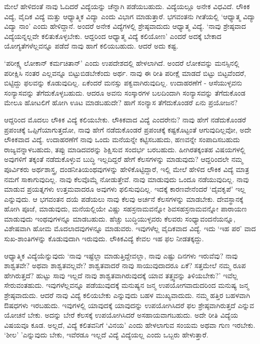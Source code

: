 ಮೇಲೆ ಹೇಳಿದಂತೆ ನಾವು ಓದಿದರೆ ವಿದ್ಯೆಯನ್ನು ಚೆನ್ನಾಗಿ ಪಡೆಯಬಹುದು. ವಿದ್ಯೆಯಲ್ಲೂ ಅನೇಕ ವಿಧವಿದೆ. ಲೌಕಿಕ ವಿದ್ಯೆ, ವೈದಿಕ ವಿದ್ಯೆ ಮತ್ತು 
ಆಧ್ಯಾತ್ಮಿಕ ವಿದ್ಯಾ  ಎಂದು ವಿಭಾಗ ಮಾಡುತ್ತಾರೆ. ಭಗವಂತನು ಗೀತೆಯಲ್ಲಿ `ಆಧ್ಯಾತ್ಮ ವಿದ್ಯಾ ವಿದ್ಯಾ ನಾಂ' ಎಂದು ಹೇಳಿದ್ದಾನೆ. ಅಂದರೆ ಅನೇಕ 
ವಿದ್ಯೆಗಳಲ್ಲಿ ಶ್ರೇಷ್ಠವಾದುದು ಆಧ್ಯಾತ್ಮ ವಿದ್ಯೆ. `ನಾವು ಶ್ರೇಷ್ಠವಾದ ವಿದ್ಯೆಯನ್ನಲ್ಲವೇ ಕಲಿತುಕೊಳ್ಳಬೇಕು. ಆದ್ದರಿಂದ ಆಧ್ಯಾತ್ಮ ವಿದ್ಯೆ ಕಲಿಯೋಣ' 
ಎಂದರೆ ಅದಕ್ಕೆ ಬೇಕಾದ ಯೋಗ್ಯತೆಗಳೆಲ್ಲವನ್ನೂ ಪಡೆದೆ ನಾವು ಹಾಗೆ ಕಲಿಯಬಹುದು. ಆದರೆ ಅದು ಕಷ್ಟ.

`ಪರೀಕ್ಷ್ಯ ಲೋಕಾನ್ ಕರ್ಮಚಿತಾನ್' ಎಂದು ಉಪದೇಶದಲ್ಲಿ ಹೇಳಲಾಗಿದೆ. ಅಂದರೆ ಲೋಕವನ್ನು ಮನಸ್ಸಿನಲ್ಲಿ ಪರೀಕ್ಷಿಸಿ ನಂತರ ಎಲ್ಲವನ್ನೂ ಬಿಟ್ಟುಬಿಡಬೇಕೆಂದು ಅರ್ಥ. 
ನಾವು ಈ ರೀತಿ ಪರೀಕ್ಷೆ ಮಾಡದೆ ಬಿಟ್ಟು ಬಿಟ್ಟವೆಂದರೆ, ಬಿಟ್ಟಿದ್ದು ಫಲವನ್ನು ಕೊಡುವುದಿಲ್ಲ. ಏಕೆಂದರೆ ಮನಸ್ಸು ಪಕ್ವವಾಗಿರುವುದಿಲ್ಲ. ಉದಾಹರಣೆಗೆ - ಆಸೆಯುಳ್ಳವನು 
ಸಂನ್ಯಾಸವನ್ನು ತೆಗೆದುಕೊಳ್ಳಬಹುದು. ಆದರೂ ಅವನು ಸಂಸ್ಕಾರಗಳ ಬಲದಿಂದಾಗಿ ಸಂನ್ಯಾಸವನ್ನು ತೆಗೆದುಕೊಂಡ 
ಮೇಲೂ ಹೋಟಲಿಗೆ ಹೋಗಿ ಊಟ ಮಾಡಬಹುದೇ? ಹಾಗೆ ಸಂನ್ಯಾಸ ತೆಗೆದುಕೊಂಡರೆ ಏನು ಪ್ರಯೋಜನ?

ಆದ್ದರಿಂದ ಮೊದಲು ಲೌಕಿಕ ವಿದ್ಯೆ ಕಲಿಯಬೇಕು. ಲೌಕಿಕವಾದ ವಿದ್ಯೆ ಎಂದರೇನು? ನಾವು ಹೇಗೆ ನಡೆದುಕೊಂಡರೆ ಪ್ರಪಂಚಕ್ಕೆ ಒಪ್ಪಿಗೆಯಾಗುತ್ತದೋ, ನಾವು 
ಹೇಗೆ ನಡೆದುಕೊಂಡರೆ ಪ್ರಪಂಚಕ್ಕೆ ಕಷ್ಟಕೊಟ್ಟಂತೆ ಆಗುವುದಿಲ್ಲವೋ, ಅದೇ ಲೌಕಿಕವಾದ ವಿದ್ಯೆ. ಉದಾಹರಣೆಗೆ ನಾವು ಒಂದು ಮನೆಯನ್ನೇ ಕಟ್ಟಿಸಬಹುದು, 
ಹಣವನ್ನೇ ಸಂಪಾದಿಸಬಹುದು ರಾಜ್ಯವನ್ನಾಳಬಹುದು, ತಪ್ಪು ಮಾಡಿದವರನ್ನು ಶಿಕ್ಷಿಸುವ ಸಂದರ್ಭ ಬರಬಹುದು. ಹೀಗಿರತಕ್ಕಂತಹ ವಿಷಯಗಳಲ್ಲಿ 
ಅವುಗಳಿಗೆ ತಕ್ಕಂತೆ ನಡೆದುಕೊಳ್ಳುವ ಬುದ್ಧಿ ಇಲ್ಲದಿದ್ದರೆ ಹೇಗೆ ಕೆಲಸಗಳನ್ನು ಮಾಡುವುದು? ಆದ್ದರಿಂದಲೇ ನಮ್ಮ ಪೂರ್ವಿಕರು ಅರ್ಥಶಾಸ್ತ್ರ, 
ದಂಡನೀತಿಯಂಥವುಗಳನ್ನು ಹೇಳಿಕೊಟ್ಟಿದ್ದಾರೆ, ಇಲ್ಲಿ ಮೇಲೆ ಹೇಳಿದ ಲೌಕಿಕ ವಿದ್ಯೆ ಮಾತ್ರ ನಮಗೆ ಸಾಕಾಗುವುದಿಲ್ಲ. ನಾವು ಕೆಲವೊಮ್ಮೆ 
ನೋಡುತ್ತೇವೆ. ನಾವು ಮಾಡುವುದು ಒಂದೂ ನಡೆಯುವುದಿಲ್ಲ. ನಾವು ಮಾಡುವ ಪ್ರಯತ್ನಗಳು ಉತ್ತಮವಾದರೂ ಅವುಗಳು ಫಲಿಸುವುದಿಲ್ಲ. ಇದಕ್ಕೆ 
ಕಾರಣವೇನೆಂದರೆ `ದೈವಕೃಪೆ' ಇಲ್ಲ ಎನ್ನುವುದು. ಆ ಭಗವಂತನ ದಯೆ ಪಡೆಯಲು ನಾವು ಕೆಲವು ಅರ್ಚನೆ ಕೆಲಸಗಳನ್ನು ಮಾಡಬೇಕು. ದೇವಸ್ಥಾನಕ್ಕೆ 
ಹೋಗಿ ಪೂಜೆ, ಮಾಡುವುದು, ಮನೆಯಲ್ಲಿಯೇ ವಿಷ್ಣು ಸಹಸ್ರನಾಮವನ್ನೋ ಶಿವಸಹಸ್ರನಾಮವನ್ನೋ ಪಾರಾಯಣ ಮಾಡುವುದು ಇಂಥವುಗಳನ್ನೂ 
ಮಾಡಬಹುದು. ಹೆಚ್ಚು ಬುದ್ಧಿಯುಳ್ಳವರು ಕೆಲವರು ಸಂಧ್ಯಾವಂದನೆಯನ್ನೂ, ವಿಶೇಷವಾಗಿ ಹೋಮ ಮೊದಲಾದವುಗಳನ್ನೂ ಮಾಡುವರು. 
ಇವುಗಳೆಲ್ಲ ವೈದಿಕವಾದ ವಿದ್ಯೆ. ಇದು `ಇಹ ಪರ' ವಾದ ಸುಖ-ಶಾಂತಿಗಳನ್ನು ಕೊಡುವುದಾಗಿ ಇರುವುದು. ಲೌಕಿಕವಿದ್ಯೆ ಕೇವಲ ಇಹ ಫಲ ನೀಡತಕ್ಕದ್ದು.

ಆಧ್ಯಾತ್ಮಿಕ ವಿದ್ಯೆಯೆನ್ನುವುದು `ನಾವು ಇಷ್ಟೆಲ್ಲಾ ಮಾಡುತ್ತಿದ್ದೇವಲ್ಲಾ, ನಾವು ಎಷ್ಟು ದಿನಗಳು ಇರುವೆವು? ನಾವು ಶಾಶ್ವತವೇ? ಅಥವಾ ಶಾಶ್ವತವಲ್ಲವೇ? ಶಾಶ್ವತವಾದರೆ 
ನಾವು ಸಾಯುವುದಾದರೂ ಏಕೆ? ಸತ್ತಮೇಲೆ ನಮ್ಮ ರೂಪ ಹೇಗಿರುತ್ತದೆ? ಹುಟ್ಟು ಸಾವು ಇಲ್ಲದೆ ನಾವು ಶಾಶ್ವತವಾಗಿರುವುದಕ್ಕೆ ಯಾವ 
ತತ್ತ್ವವನ್ನು ತಿಳಿಯಬೇಕು?' ಇವೆಲ್ಲ ಸೇರುವಂತಹುದು. ಇವುಗಳೆಲ್ಲವನ್ನೂ ಪಡೆಯುವುದಕ್ಕೆ ಮನುಷ್ಯನ ಜನ್ಮ ಉಪಯೋಗವಾದುದರಿಂದ ಮನುಷ್ಯ 
ಜನ್ಮ ಶ್ರೇಷ್ಠವಾದುದು. ಆದರೆ ನಾವು ವಿದ್ಯೆ ಕಲಿಯಬೇಕು ಎನ್ನುವುದು ಬಹಳ ಮುಖ್ಯವಾದುದು. ನಮ್ಮ ಹತ್ತಿರ ಬಹಳವಾಗಿ ಔಷಧಗಳು ಇರಬಹುದು. 
ಇವುಗಳಲ್ಲಿ ಯಾವುದಕ್ಕೆ ಯಾವುದನ್ನು ಉಪಯೋಗಿಸಿದರೆ ಫಲ ಶ್ರೇಷ್ಠವಾಗಿರುತ್ತದೆ ಎನ್ನುವ ಯೋಚನೆ ಬೇಕು. ಅದನ್ನು ಬೇರೆ ಕೆಲಸಕ್ಕೆ ಉಪಯೋಗಿಸಿದರೆ 
ಅಸಹಾಯವಾಗಬಹುದು. ಅದೇ ರೀತಿ ವಿದ್ಯೆಯ ವಿಷಯವೂ ಕೂಡ. ಅಲ್ಲದೆ, ವಿದ್ಯೆ ಕಲಿತವನಿಗೆ `ವಿನಯ' ಎಂದು ಹೇಳಲಾಗುವ ಸಂಯಮ ಅಥವಾ 
ಗುಣ ಇರಬೇಕು. `ಶೀಲ' 'ಎನ್ನುವುದು ಬೇಕು, ಇವೆರಡೂ ಇಲ್ಲದೆ ವಿದ್ಯೆ ವಿದ್ಯೆಯಲ್ಲ ಎಂದು ಒಬ್ಬರು ಹೇಳುತ್ತಾರೆ.


